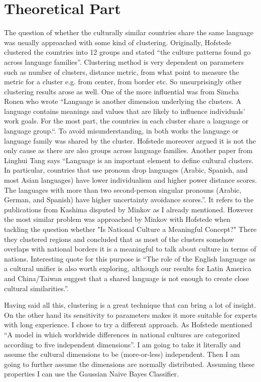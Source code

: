 \documentclass[a4paper,10pt]{article}
\begin{document}
\section{Theoretical Part}

The question of whether the culturally similar countries share the same language was usually approached with some kind of clustering.
Originally, Hofstede clustered the countries into 12 groups and stated ``the culture patterns found go across language families''\cite{hofstede2001}. %
Clustering method is very dependent on parameters such as number of clusters, distance metric, from what point to measure the metric for a cluster e.g. from center, from border etc.
So unsurprisingly other clustering results arose as well.
One of the more influential was from Simcha Ronen who wrote ``Language is another dimension underlying the clusters. A language contains meanings and values that are likely to influence individuals' work goals. For the most part, the countries in each cluster share a language or language group.``\cite{ronen1985}.
To avoid misunderstanding, in both works the language or language family was shared by the cluster. Hofstede moreover argued it is not the only cause as there are also groups across language families.
Another paper from Linghui Tang says ``Language is an important element to define cultural clusters. In particular, countries that use pronoun drop languages (Arabic, Spanish, and most Asian languages) have lower individualism and higher power distance scores. The languages with more than two second-person singular pronouns (Arabic, German, and Spanish) have higher uncertainty avoidance scores.''\cite{tang2008}.
It refers to the publications from Kashima \cite{kashima1998, kashima2003} disputed by Minkov\cite{minkov2013} as I already mentioned.
However the most similar problem was approached by Minkov with Hofstede when tackling the question whether "Is National Culture a Meaningful Concept?"
There they clustered regions and concluded that as most of the clusters somehow overlaps with national borders it is a meaningful to talk about culture in terms of nations. Interesting quote for this purpose is ``The role of the English language as a cultural unifier is also worth exploring, although our results for Latin America and China/Taiwan suggest that a shared language is not enough to create close cultural similarities.''\cite{minkov2011}.

Having said all this, clustering is a great technique that can bring a lot of insight.
On the other hand its sensitivity to parameters makes it more suitable for experts with long experience.
I chose to try a different approach. As Hofstede mentioned ``A model in which worldwide differences in national cultures are categorized according to five independent dimensions''\cite{hofstede1993}. I am going to take it literally and assume the cultural dimensions to be (more-or-less) independent.
Then I am going to further assume the dimensions are normally distributed.
Assuming these properties I can use the Gaussian Naive Bayes Classifier.
\end{document}
